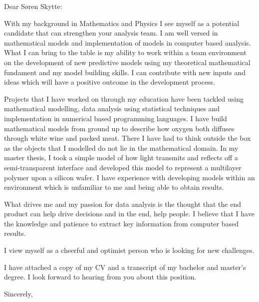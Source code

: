 \documentclass[10pt,a4paper]{letter}
\begin{document}
\begin{letter}{}
\opening{Dear Søren Skytte:}

With my background in Mathematics and Physics I see myself as a potential candidate that can strengthen your analysis team. I am well versed in mathematical models and implementation of models in computer based analysis. What I can bring to the table is my ability to work within a team environment on the development of new predictive models using my theoretical mathematical fundament and my model building skills. I can contribute with new inputs and ideas which will have a positive outcome in the development process.

Projects that I have worked on through my education have been tackled using mathematical modelling, data analysis using statistical techniques and implementation in numerical based programming languages. I have build mathematical models from ground up to describe how oxygen both diffuses through white wine and packed meat. There I have had to think outside the box as the objects that I modelled do not lie in the mathematical domain. In my master thesis, I took a simple model of how light transmits and reflects off a semi-transparent interface and developed this model to represent a multilayer polymer upon a silicon wafer. I have experience with developing models within an environment which is unfamiliar to me and being able to obtain results. 

What drives me and my passion for data analysis is the thought that the end product can help drive decisions and in the end, help people. I believe that I have the knowledge and patience to extract key information from computer based results.      

I view myself as a cheerful and optimist person who is looking for new challenges.

I have attached a copy of my CV and a transcript of my bachelor and master's degree. I look forward to hearing from you about this position.   

\closing{Sincerely,}

\end{letter}

\end{document}
